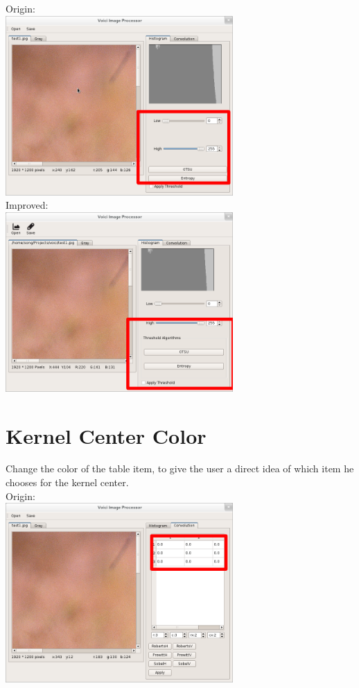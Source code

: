 \documentclass[10pt,a4paper]{article}
\begin{document}
Origin:\\
\indent\includegraphics[width=0.65\textwidth]{group_origin.png}\\

Improved:\\
\indent\includegraphics[width=0.65\textwidth]{group_improved.png}

\pagebreak

\section{Kernel Center Color}
Change the color of the table item, to give the user a direct idea of which item he chooses for the kernel center.\\

Origin:\\
\indent\includegraphics[width=0.65\textwidth]{item_origin.png}\\
\end{document}
